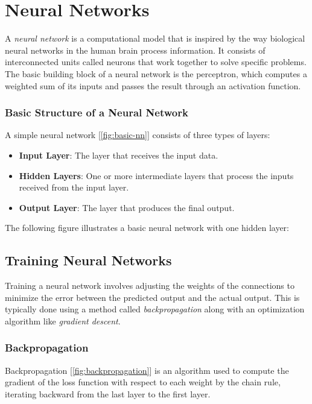 \section{Neural Networks}
\label{sec:neural_networks}

A \emph{neural network} is a computational model that is inspired by the way biological neural networks in the human brain process information. It consists of interconnected units called neurons that work together to solve specific problems. The basic building block of a neural network is the perceptron, which computes a weighted sum of its inputs and passes the result through an activation function.

\subsubsection{Basic Structure of a Neural Network}

A simple neural network [\autoref{fig:basic-nn}] consists of three types of layers:

\begin{itemize}
    \item \textbf{Input Layer}: The layer that receives the input data.
    \item \textbf{Hidden Layers}: One or more intermediate layers that process the inputs received from the input layer.
    \item \textbf{Output Layer}: The layer that produces the final output.
\end{itemize}

The following figure illustrates a basic neural network with one hidden layer:


\subsection{Training Neural Networks}

Training a neural network involves adjusting the weights of the connections to minimize the error between the predicted output and the actual output. This is typically done using a method called \emph{backpropagation} along with an optimization algorithm like \emph{gradient descent}.

\subsubsection{Backpropagation}
Backpropagation [\autoref{fig:backpropagation}] is an algorithm used to compute the gradient of the loss function with respect to each weight by the chain rule, iterating backward from the last layer to the first layer.


